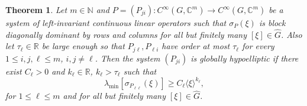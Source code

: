 \documentclass[11pt]{amsart}
\newtheorem{theorem}{Theorem}
\numberwithin{theorem}{section}
\numberwithin{equation}{section}
\theoremstyle{definition}
\numberwithin{example}{section}
\theoremstyle{definition}
\theoremstyle{definition}
\newcommand{\R}{\mathbb{R}}
\newcommand{\N}{\mathbb{N}}
\begin{document}
\begin{theorem}\label{thoerem_diagonal}
     Let $m\in\N$ and $P=(P_{ji}):C^\infty(G,\mathbb{C}^m)\to C^\infty(G,\mathbb{C}^m)$ be a system of left-invariant continuous linear operators such that $\sigma_P(\xi)$ is block diagonally dominant by rows and columns for all but finitely many $[\xi]\in\widehat{G}$. Also let $\tau_\ell\in\R$ be large enough so that $P_{j\ell},P_{\ell i}$ have order at most $\tau_\ell$ for every $1\leq i,j,\ell\leq m$, $i,j\neq \ell$.
     Then the system $(P_{ji})$ is globally hypoelliptic if there exist $C_\ell>0$ and $k_\ell\in\R$, $k_\ell>\tau_\ell$ such that
    \begin{equation*}
        \lambda_{\min}[\sigma_{P_{\ell\ell}}(\xi)]\geq C_\ell\langle\xi\rangle^{k_\ell},
    \end{equation*}
    for $1\leq \ell\leq m$ and for all but finitely many $[\xi]\in\widehat{G}$.
\end{theorem}

\end{document}

